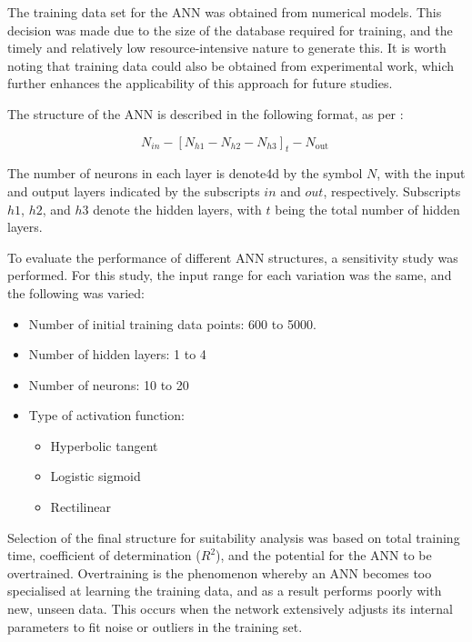 The training data set for the ANN was obtained from numerical models. This decision was made due to the size of the database required for training, and the timely and relatively low resource-intensive nature to generate this. It is worth noting that training data could also be obtained from experimental work, which further enhances the applicability of this approach for future studies.

The structure of the ANN is described in the following format, as per \cite{Zhang2002}:

\begin{equation}
	N_{i n}-\left[N_{h 1}-N_{h 2}-N_{h 3}\right]_t-N_{\text {out }}
\end{equation}

The number of neurons in each layer is denote4d by the symbol $N$, with the input and output layers indicated by the subscripts $in$ and $out$, respectively. Subscripts $h1$, $h2$, and $h3$ denote the hidden layers, with $t$ being the total number of hidden layers.

To evaluate the performance of different ANN structures, a sensitivity study was performed. For this study, the input range for each variation was the same, and the following was varied:

\begin{itemize}
	\item Number of initial training data points: 600 to 5000.
	\item Number of hidden layers: 1 to 4
	\item Number of neurons: 10 to 20
    \item Type of activation function: 
    \begin{itemize}
    	\item Hyperbolic tangent
    	\item Logistic sigmoid
    	\item Rectilinear
    \end{itemize}
\end{itemize}

Selection of the final structure for suitability analysis was based on total training time, coefficient of determination ($R^2$), and the potential for the ANN to be overtrained. Overtraining is the phenomenon whereby an ANN becomes too specialised at learning the training data, and as a result performs poorly with new, unseen data. This occurs when the network extensively adjusts its internal parameters to fit noise or outliers in the training set.

